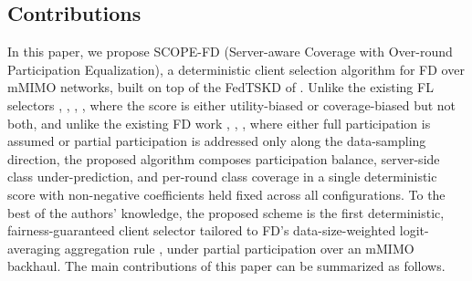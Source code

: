 \documentclass[journal]{IEEEtran}
\newcommand{\revIVE}[1]{#1}
\begin{document}
\subsection{Contributions}
\label{ssec:contributions}

In this paper, we propose SCOPE-FD (Server-aware Coverage with Over-round Participation Equalization), a deterministic client selection algorithm for FD over mMIMO networks, built on top of the FedTSKD of \cite{mu2024fedtskd}. Unlike the existing FL selectors \cite{nishio2019client}, \cite{cho2020bandit}, \cite{xia2020mab}, \cite{balakrishnan2022divfl}, where the score is either utility-biased or coverage-biased but not both, and unlike the existing FD work \cite{mu2024fedtskd}, \cite{itahara2023distillation}, \cite{liu2022active}, where either full participation is assumed or partial participation is addressed only along the data-sampling direction, the proposed algorithm composes participation balance, server-side class under-prediction, and per-round class coverage in a single deterministic score \revIVE{with non-negative coefficients held fixed across all configurations}. To the best of the authors' knowledge, the proposed scheme is the first deterministic, fairness-guaranteed client selector tailored to FD's data-size-weighted logit-averaging aggregation rule \cite{itahara2023distillation}, \cite{mu2024fedtskd} under partial participation over an mMIMO backhaul. The main contributions of this paper can be summarized as follows.
\end{document}
